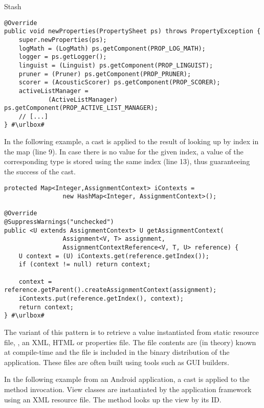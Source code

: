 \begin{pattern}{Stash}
\begin{verbatim}
@Override
public void newProperties(PropertySheet ps) throws PropertyException {
    super.newProperties(ps);
    logMath = (LogMath) ps.getComponent(PROP_LOG_MATH);
    logger = ps.getLogger();
    linguist = (Linguist) ps.getComponent(PROP_LINGUIST);
    pruner = (Pruner) ps.getComponent(PROP_PRUNER);
    scorer = (AcousticScorer) ps.getComponent(PROP_SCORER);
    activeListManager = 
            (ActiveListManager) ps.getComponent(PROP_ACTIVE_LIST_MANAGER);
    // [...]
} #\urlbox#
\end{verbatim}

In the following example,
a cast is applied to the result of looking up by index in the  map (line 9).
In case there is no value for the given index,
a value of the corresponding type is stored using the same index (line 13),
thus guaranteeing the success of the cast.

\def\urlvar{http://bit.ly/UniTime_cpsolver_2HUmGki}
\begin{verbatim}
protected Map<Integer,AssignmentContext> iContexts =
                new HashMap<Integer, AssignmentContext>();

@Override
@SuppressWarnings("unchecked")
public <U extends AssignmentContext> U getAssignmentContext(
                Assignment<V, T> assignment,
                AssignmentContextReference<V, T, U> reference) {
    U context = (U) iContexts.get(reference.getIndex());
    if (context != null) return context;
    
    context = reference.getParent().createAssignmentContext(assignment);
    iContexts.put(reference.getIndex(), context);
    return context;
} #\urlbox#
\end{verbatim}

The  variant of this pattern is to retrieve a value instantiated from
static resource file, \eg, an XML, HTML or \java{} properties file.
The file contents are (in theory) known at compile-time and the file is included in the binary distribution of the application.
These files are often built using tools such as GUI builders.

In the following example from an Android application,
a cast is applied to the  method invocation.
View classes are instantiated by the application framework using an XML resource file.
The  method looks up the view by its ID.


\end{pattern}
